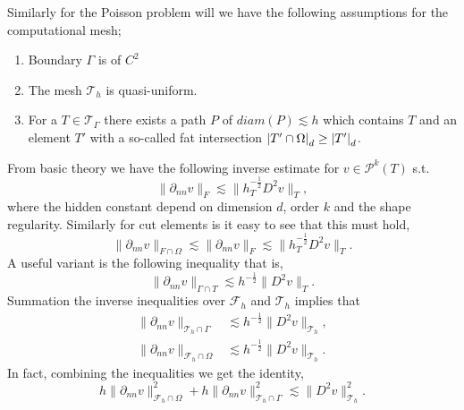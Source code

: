 Similarly for the Poisson problem will we have the following assumptions for the computational mesh;

\begin{enumerate}[label=\textbf{S.\arabic*}]
    \item\label{as:s1} Boundary $\Gamma $ is of $C^2$
    \item\label{as:s2} The mesh $\mathcal{T} _{h}$ is quasi-uniform.
    \item \label{as:s3}For a $T \in \mathcal{T} _{\Gamma }$ there exists a path $P$ of $diam(P) \lesssim h$ which contains $T$ and an element $T'$ with a so-called fat intersection $
    \left\lvert  T' \cap \Omega   \right\rvert _{d} \ge \left\lvert  T'  \right\rvert _{d}$.
\end{enumerate}


From basic theory we have the following inverse estimate for $ v \in \mathcal{P}^{k}( T)$ s.t. \[
     \| \partial _{nn}  v \|_{F   }^{ }  \lesssim  \| h_{T}^{-\frac{1}{2}} D ^2 v \|_{ T }^{  },
\]
where the hidden constant depend on dimension $d$, order $k$ and the shape regularity. Similarly for cut elements is it easy to see that this must hold,
\begin{equation*}
     \| \partial _{nn}  v \|_{F \cap \Omega    }^{  }  \lesssim\| \partial _{nn}  v \|_{F }^{  }  \lesssim   \| h_{T}^{-\frac{1}{2}} D ^2 v \|_{ T }^{  }.
\end{equation*}
A useful variant is the following inequality that is,
\begin{equation*}
\| \partial _{nn} v \|_{ \Gamma \cap T  }^{  } \lesssim h^{-\frac{1}{2}} \| D^2 v \|_{ T }^{  }.
\end{equation*}
Summation the inverse inequalities over $\mathcal{F}_{h} $ and $\mathcal{T}_{h} $ implies that
\begin{align}
\label{eq:bi_cut_inverse_1}
\| \partial _{nn} v \|_{ \mathcal{T} _{h} \cap \Gamma  }^{  } &\lesssim h^{-\frac{1}{2}} \| D^2 v \|_{ \mathcal{T}_h }^{  }, \\
\label{eq:bi_cut_inverse_2}
\| \partial _{nn}  v \|_{ \mathcal{F}_h \cap \Omega    }^{  }  &  \lesssim   h^{-\frac{1}{2}} \| D^2 v \|_{ \mathcal{T}_h  }^{  }.
\end{align}
In fact, combining the inequalities we get the identity,
\begin{equation}
\label{eq:bi_identity}
h\| \partial _{nn}  v \|_{ \mathcal{F}_h \cap \Omega    }^{2 } + h\| \partial _{nn} v \|_{ \mathcal{T} _{h} \cap \Gamma  }^{2  } \lesssim \| D^2 v \|_{ \mathcal{T} _{h}  }^{2  }.
\end{equation}

